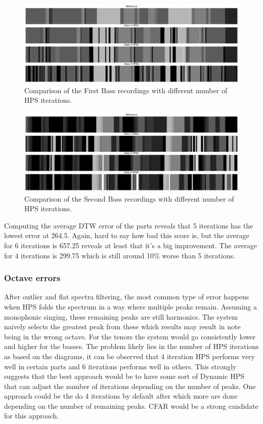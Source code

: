 \begin{figure}[ht]
    \centering
    \includegraphics[width=\textwidth]{./images/hpsBass1.png}
    \caption{Comparison of the First Bass recordings with different number of HPS iterations. \label{fig:hpsBass1}}
\end{figure}


\begin{figure}[ht]
    \centering
    \includegraphics[width=\textwidth]{./images/hpsBass2.png}
    \caption{Comparison of the Second Bass recordings with different number of HPS iterations. \label{fig:hpsBass2}}
\end{figure}

Computing the average DTW error of the parts reveals that 5 iterations has the lowest error at 264.5. Again, hard to say how bad this score is, but the average for 6 iterations is 657.25 reveals at least that it's a big improvement. The average for 4 iterations is 299.75 which is still around 10\% worse than 5 iterations.

\subsubsection{Octave errors}
After outlier and flat spectra filtering, the most common type of error happens when HPS folds the spectrum in a way where multiple peaks remain. Assuming a monophonic singing, these remaining peaks are still harmonics. The system naively selects the greatest peak from these which results may result in note being in the wrong octave. For the tenors the system would go consistently lower and higher for the basses. The problem likely lies in the number of HPS iterations as based on the diagrams, it can be observed that 4 iteration HPS performs very well in certain parts and 6 iterations performs well in others. This strongly suggests that the best approach would be to have some sort of Dynamic HPS that can adjust the number of iterations depending on the number of peaks. One approach could be the do 4 iterations by default after which more are done depending on the number of remaining peaks. CFAR would be a strong candidate for this approach.

